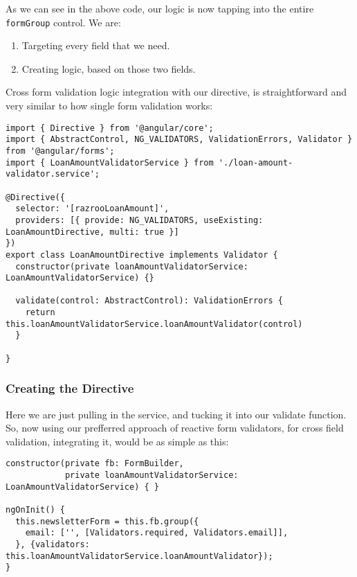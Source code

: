 As we can see in the above code, our logic is now tapping into the entire 
\lstinline{formGroup} control. We are: 
\begin{enumerate}
  \item Targeting every field that we need.
  \item Creating logic, based on those two fields.    
\end{enumerate}

Cross form validation logic integration with our directive, is straightforward and very similar 
to how single form validation works: 

\begin{lstlisting}[caption=loan-amount.directive.ts]
import { Directive } from '@angular/core';
import { AbstractControl, NG_VALIDATORS, ValidationErrors, Validator } from '@angular/forms';
import { LoanAmountValidatorService } from './loan-amount-validator.service';

@Directive({
  selector: '[razrooLoanAmount]',
  providers: [{ provide: NG_VALIDATORS, useExisting: LoanAmountDirective, multi: true }]
})
export class LoanAmountDirective implements Validator {
  constructor(private loanAmountValidatorService: LoanAmountValidatorService) {}

  validate(control: AbstractControl): ValidationErrors {
    return this.loanAmountValidatorService.loanAmountValidator(control)
  }

} 
\end{lstlisting}

\subsubsection{Creating the Directive}

Here we are just pulling in the service, and tucking it into our validate function. So, 
now using our prefferred approach of reactive form validators, for cross field validation, 
integrating it, would be as simple as this:

\begin{lstlisting}[caption=finance-calculator.component.ts]
constructor(private fb: FormBuilder,
            private loanAmountValidatorService: LoanAmountValidatorService) { }

ngOnInit() {
  this.newsletterForm = this.fb.group({
    email: ['', [Validators.required, Validators.email]],
  }, {validators: this.loanAmountValidatorService.loanAmountValidator});
}
\end{lstlisting}

